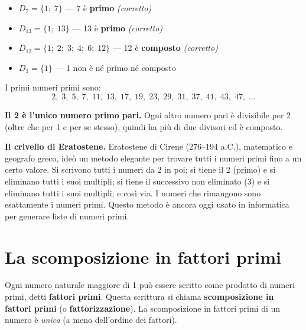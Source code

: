 \begin{esempio}
    \begin{itemize}[leftmargin=1.5em]
        \item $D_7 = \{1;\; 7\}$ \quad — 7 è \textbf{primo} \quad\textit{(corretto)}
        \item $D_{13} = \{1;\; 13\}$ \quad — 13 è \textbf{primo} \quad\textit{(corretto)}
        \item $D_{12} = \{1;\; 2;\; 3;\; 4;\; 6;\; 12\}$ \quad — 12 è \textbf{composto} \quad\textit{(corretto)}
        \item $D_1 = \{1\}$ \quad — 1 non è né primo né composto
    \end{itemize}
\end{esempio}

I primi numeri primi sono:
\[
    2,\; 3,\; 5,\; 7,\; 11,\; 13,\; 17,\; 19,\; 23,\; 29,\; 31,\; 37,\; 41,\; 43,\; 47,\; \ldots
\]

\begin{attenzione}
    \textbf{Il 2 è l'unico numero primo pari.} Ogni altro numero pari è divisibile per 2
    (oltre che per 1 e per se stesso), quindi ha più di due divisori ed è composto.
\end{attenzione}

\begin{sapevi}
    \textbf{Il crivello di Eratostene.}
    Eratostene di Cirene (276–194 a.C.), matematico e geografo greco, ideò un metodo
    elegante per trovare tutti i numeri primi fino a un certo valore. Si scrivono
    tutti i numeri da 2 in poi; si tiene il 2 (primo) e si eliminano tutti i suoi
    multipli; si tiene il successivo non eliminato (3) e si eliminano tutti i suoi
    multipli; e così via. I numeri che rimangono sono esattamente i numeri primi.
    Questo metodo è ancora oggi usato in informatica per generare liste di numeri primi.
\end{sapevi}

\section{La scomposizione in fattori primi}

\begin{definizione}
    Ogni numero naturale maggiore di 1 può essere scritto come prodotto di numeri
    primi, detti \textbf{fattori primi}. Questa scrittura si chiama
    \textbf{scomposizione in fattori primi} (o \textbf{fattorizzazione}).
    La scomposizione in fattori primi di un numero è \emph{unica}
    (a meno dell'ordine dei fattori).
\end{definizione}

